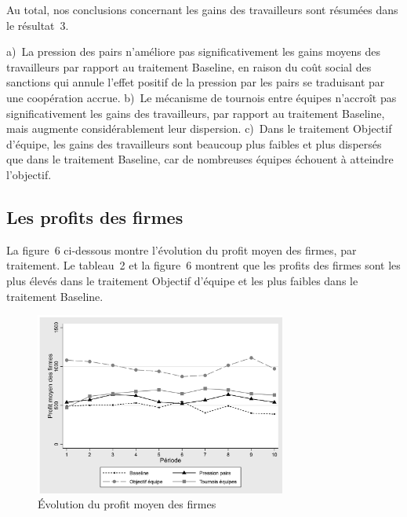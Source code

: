 \begin{Article}
\begin{refsection}[Lebourges]
Au total, nos conclusions concernant les gains des travailleurs sont
résumées dans le résultat~3.

\newpage

\vspace{.2cm}
\begin{resultat}
a)~La pression des pairs n'améliore pas
significativement les gains moyens des travailleurs par rapport au
traitement Baseline, en raison du coût social des sanctions qui annule
l'effet positif de la pression par les pairs se traduisant par une
coopération accrue. b)~Le mécanisme de tournois entre équipes n'accroît
pas significativement les gains des travailleurs, par rapport au
traitement Baseline, mais augmente considérablement leur dispersion.
c)~Dans le traitement Objectif d'équipe, les gains des travailleurs sont
beaucoup plus faibles et plus dispersés que dans le traitement Baseline,
car de nombreuses équipes échouent à atteindre l'objectif.
\end{resultat}


\subsection{Les profits des firmes}

La figure~6 ci-dessous montre l'évolution du profit moyen des firmes,
par traitement. Le tableau~2 et la figure~6 montrent que les profits
des firmes sont les plus élevés dans le traitement Objectif d'équipe et
les plus faibles dans le traitement Baseline.

\begin{figure}[h]
    \centering
    \caption{Évolution du profit moyen des firmes}
    \includegraphics[height=6cm]{05_graph6.png}
\end{figure}


\end{refsection}
\end{Article}
